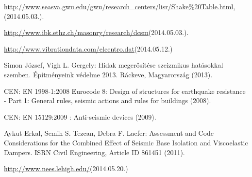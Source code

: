 \documentclass[a4paper,12pt]{report}
\begin{document}
\begin{thebibliography}{1}
\url{http://www.seasva.gwu.edu/gwu/research_centers/lisr/Shake%20Table.html}, (2014.05.03.).

\url{http://www.ibk.ethz.ch/masonry/research/dcsm}(2014.05.03.).

\url{http://www.vibrationdata.com/elcentro.dat}(2014.05.12.)

 Simon József, Vigh L. Gergely: Hidak megerősítése szeizmikus hatásokkal szemben. Építményeink védelme 2013. Ráckeve, Magyarország (2013).

 CEN: EN 1998-1:2008 Eurocode 8: Design of structures for earthquake resistance - Part 1: General rules, seismic actions and rules for buildings (2008).

  CEN: EN 15129:2009 : Anti-seismic devices (2009).

 Aykut Erkal, Semih S. Tezcan, Debra F. Laefer: Assessment and Code Considerations for the Combined Effect of Seismic Base Isolation and Viscoelastic Dampers. ISRN Civil Engineering, Article ID 861451 (2011).

 \url{http://www.nees.lehigh.edu/}(2014.05.20.)

 \thispagestyle{empty}
\end{thebibliography}
\end{document}
